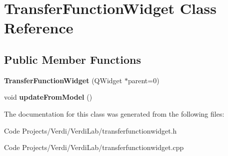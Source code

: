 \hypertarget{class_transfer_function_widget}{\section{\-Transfer\-Function\-Widget \-Class \-Reference}
\label{class_transfer_function_widget}
}
\subsection*{\-Public \-Member \-Functions}
\begin{DoxyCompactItemize}
\item 
\hypertarget{class_transfer_function_widget_a720e616e013ba937b2ccfceaf1b72fbc}{{\bfseries \-Transfer\-Function\-Widget} (\-Q\-Widget $\ast$parent=0)}\label{class_transfer_function_widget_a720e616e013ba937b2ccfceaf1b72fbc}

\item 
\hypertarget{class_transfer_function_widget_a8e55572c6e51660edf1d69be436aa08c}{void {\bfseries update\-From\-Model} ()}\label{class_transfer_function_widget_a8e55572c6e51660edf1d69be436aa08c}

\end{DoxyCompactItemize}


\-The documentation for this class was generated from the following files\-:\begin{DoxyCompactItemize}
\item 
\-Code Projects/\-Verdi/\-Verdi\-Lab/transferfunctionwidget.\-h\item 
\-Code Projects/\-Verdi/\-Verdi\-Lab/transferfunctionwidget.\-cpp\end{DoxyCompactItemize}
